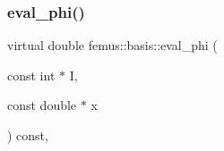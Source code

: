 \mbox{\label{classfemus_1_1basis_a89b0797cdccffae5ff6d059b32016ae5}} 
\subsubsection{\texorpdfstring{eval\+\_\+phi()}{eval\_phi()}\hspace{0.1cm}{\footnotesize\ttfamily [2/2]}}
{\footnotesize\ttfamily virtual double femus\+::basis\+::eval\+\_\+phi (\begin{DoxyParamCaption}\item[{const int $\ast$}]{I,  }\item[{const double $\ast$}]{x }\end{DoxyParamCaption}) const\hspace{0.3cm}{\ttfamily [inline]}, {\ttfamily [virtual]}}



